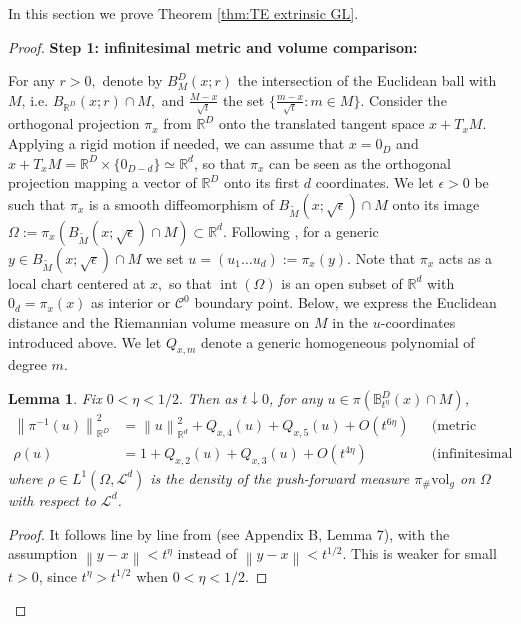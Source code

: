 \documentclass{amsart}
\let\oldcite\cite
\renewcommand{\cite}[1]{\textcolor{blue}{\oldcite{#1}}}
\newtheorem{lemma}[theorem]{Lemma}
\theoremstyle{definition}
\theoremstyle{remark}
\newcommand{\nd}{\noindent}
\newcommand{\norm}[1]{\left\lVert#1\right\rVert}
\newcommand{\ddim}{\mathbb{R}^d}
\newcommand{\Ddim}{\mathbb{R}^D}
\newcommand{\0}{\boldsymbol{0}}
\newcommand{\df}{\coloneqq}
\newcommand{\coloneqq}{:=}
\newcommand{\setR}{\mathbb{R}}
\def\cC{\mathcal C}
\begin{document}
In this section we prove Theorem \ref{thm:TE extrinsic GL}.
\begin{proof}

\nd \textbf{Step 1: infinitesimal metric and volume comparison:}

\nd For any $r>0,$ denote by $B_M^D(x;r)$ the intersection of the Euclidean ball with $M$, i.e. $B_{\Ddim}(x;r)\cap M,$
and $\frac{M-x}{\sqrt{t}}$ the set $\{\frac{m-x}{\sqrt{t}}:m\in M\}.$
Consider the orthogonal projection $\pi_x$ from $\setR^D$ onto the translated tangent space $x + T_xM$. Applying a rigid motion if needed, we can assume that $x=0_D$ and $x+T_xM=\Ddim \times \{0_{D-d}\} \simeq \setR^d$, so that $\pi_x$ can be seen as the orthogonal projection mapping a vector of $\Ddim$ onto its first $d$ coordinates. We let $\epsilon>0$ be such that $\pi_x$ is a smooth diffeomorphism of $B_{\widetilde{M}}(x;\sqrt{\epsilon}) \cap M$ onto its image
 $\Omega \df \pi_x (B_{\widetilde{M}}(x;\sqrt{\epsilon}) \cap M) \subset \ddim.$
 Following \cite{CoifmanLafon2006}, for a generic $y \in B_{\widetilde{M}}(x;\sqrt{\epsilon}) \cap M$ we set $u=(u_1 \dots u_d):=\pi_x(y).$ Note that $\pi_x$ acts as a local chart centered at $x,$ so that $\operatorname{int}(\Omega)$ is an open subset of $\ddim$ with $0_d=\pi_x(x)$ as interior or $\cC^0$ boundary point. Below, we express the Euclidean distance and the Riemannian volume measure on $M$ in the $u$-coordinates introduced above. We let $Q_{x,m}$ denote a generic homogeneous polynomial of degree $m.$ 

 
\begin{lemma}\label{lem:prep}
Fix $0< \eta < 1/2.$ Then as $t \downarrow 0$, for any $u \in \pi(\mathbb{B}_{t^\eta}^D(x) \cap M)$,
 \begin{align*}
    \norm{\pi^{-1}(u)}_{\setR^D}^2 &= \norm{u}_{\ddim}^2 + Q_{x,4}(u) + Q_{x,5}(u) + O(t^{6\eta}) && \text{(metric comparison)} \\
    \rho(u) 
    &= 1 + Q_{x,2}(u) + Q_{x,3}(u) + O(t^{4\eta}) && \text{(infinitesimal volume comparison)}
\end{align*}
where $\rho \in L^1(\Omega,\mathcal{L}^d)$ is the density of the push-forward measure $\pi_\# \mathrm{vol}_g$ on $\Omega$ with respect to $\mathcal{L}^d$.
\end{lemma}
 
\begin{proof}
    It follows line by line from \cite{CoifmanLafon2006} (see Appendix B, Lemma 7), with the assumption $\norm{y-x}<t^{\eta}$ instead of $\norm{y-x}<t^{1/2}$. This is weaker for small $t>0$, since $t^{\eta}>t^{1/2}$ when $0<\eta<1/2$.
\end{proof}
 


\end{proof}
\end{document}
